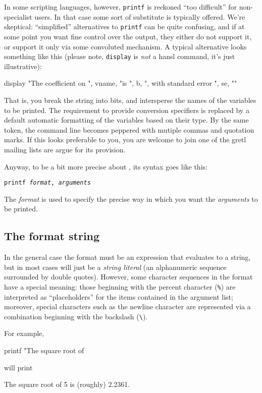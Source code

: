 In some scripting languages, however, \texttt{printf} is reckoned
``too difficult'' for non-specialist users. In that case some sort of
substitute is typically offered. We're skeptical: ``simplified''
alternatives to \texttt{printf} can be quite confusing, and if at some
point you want fine control over the output, they either do not
support it, or support it only via some convoluted mechanism. A
typical alternative looks something like this (please note,
\texttt{display} is \textit{not} a hansl command, it's just
illustrative):
\begin{code}
display "The coefficient on ", vname, "is ", b, ", with standard error ", se, "\n"
\end{code}
That is, you break the string into bits, and intersperse the names of
the variables to be printed. The requirement to provide conversion
specifiers is replaced by a default automatic formatting of the
variables based on their type. By the same token, the command line
becomes peppered with mutiple commas and quotation marks. If this looks
preferable to you, you are welcome to join one of the gretl mailing
lists are argue for its provision.

Anyway, to be a bit more precise about , its syntax goes
like this:
\begin{flushleft}
  \texttt{printf \emph{format}, \emph{arguments}}
\end{flushleft}
The \emph{format} is used to specify the precise way in which you want
the \emph{arguments} to be printed.

\subsection{The format string}
\label{sec:fmtstring}

In the general case the  format must be an expression that
evaluates to a string, but in most cases will just be a \textit{string
  literal} (an alphanumeric sequence surrounded by double
quotes). However, some character sequences in the format have a
special meaning: those beginning with the percent character
(\texttt{\%}) are interpreted as ``placeholders'' for the items
contained in the argument list; moreover, special characters such as
the newline character are represented via a combination beginning with
the backslash (\verb|\|).

For example,
\begin{code}
printf "The square root of %
\end{code}
will print 
\begin{code}
The square root of 5 is (roughly) 2.2361.
\end{code}

